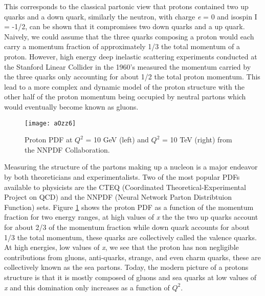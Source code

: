 \noindent
This corresponds to the classical partonic view that protons contained two up quarks and a down quark, similarly the neutron, with charge \textit{e} = 0 and isospin I = -1/2, can be shown that it compromises two down quarks and a up quark.  Naively, we could assume that the three quarks composing a proton would each carry a momentum fraction of approximately 1/3 the total momentum of a proton.  However, high energy deep inelastic scattering experiments conducted at the Stanford Linear Collider in the 1960's\cite{Panofsky:871460} measured the momentum carried by the three quarks only accounting for about 1/2 the total proton momentum.  This lead to a more complex and dynamic model of the proton structure with the other half of the proton momentum being occupied by neutral partons which would eventually become known as gluons.

\begin{figure}[h]
\texttt{[image: aOzz6]}
\centering
\caption{Proton PDF at $Q^{2}$ = 10 GeV (left) and  $Q^{2}$ = 10 TeV (right) from the NNPDF Collaboration\cite{Feltesse:2010}.}
\label{fig:PDFNNPDF}
\end{figure}

Measuring the structure of the partons making up a nucleon is a major endeavor by both theoreticians and experimentalists.  Two of the most popular PDFs available to physicists are the CTEQ\cite{Kovarik:2013sya} (Coordinated Theoretical-Experimental Project on QCD) and the NNPDF\cite{Ball:1966481} (Neural Network Parton Distribtuion Function) sets.  Figure \ref{fig:PDFNNPDF} shows the proton PDF as a function of the momentum fraction for two energy ranges, at high values of \textit{x} the the two up quarks account for about 2/3 of the momentum fraction while down quark accounts for about 1/3 the total momentum, these quarks are collectively called the valence quarks.  At high energies, low values of \textit{x}, we see that the proton has non negligible contributions from gluons, anti-quarks, strange, and even charm quarks, these are collectively known as the sea partons.  Today, the modern picture of a protons structure is that it is mostly composed of gluons and sea quarks at low values of \textit{x} and this domination only increases as a function of $Q^{2}$\cite{Fritzsch:1992mu}.

